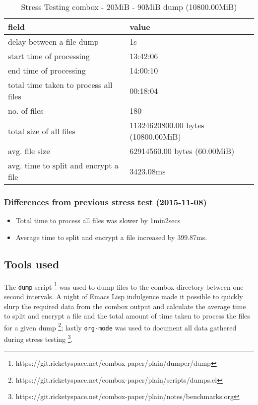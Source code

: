 \begin{center}
  \begin{table}[h]
    \begin{tabular}{ll}
      field & value\\
      \hline
      delay between a file dump & 1s\\
      start time of processing & 13:42:06\\
      end time of processing & 14:00:10\\
      total time taken to process all files & 00:18:04\\
      no. of files & 180\\
      total size of all files & 11324620800.00 bytes (10800.00MiB)\\
      avg. file size & 62914560.00 bytes (60.00MiB)\\
      avg. time to split and encrypt a file & 3423.08ms\\
    \end{tabular}
    \caption{Stress Testing combox - 20MiB - 90MiB dump (10800.00MiB)}
  \end{table}
\end{center}

\subsubsection{Differences from previous stress test (2015-11-08)}

\begin{itemize}
\item Total time to process all files was slower by 1min2secs
\item Average time to split and encrypt a file increased by 399.87ms.
\end{itemize}

\subsection{Tools used}\label{4-st-tu}

The \verb+dump+ script
\footnote{https://git.ricketyspace.net/combox-paper/plain/dumper/dump}
was used to dump files to the combox directory between one second
intervals. A night of Emacs Lisp indulgence made it possible to
quickly slurp the required data from the combox output and calculate
the average time to split and encrypt a file and the total amount of
time taken to process the files for a given dump
\footnote{https://git.ricketyspace.net/combox-paper/plain/scripts/dumps.el};
lastly \verb+org-mode+ was used to document all data gathered during
stress testing
\footnote{https://git.ricketyspace.net/combox-paper/plain/notes/benchmarks.org}.

